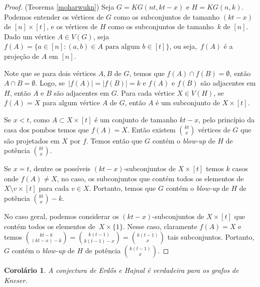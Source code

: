 \documentclass{article}
\newtheorem{corolario}{Corolário}
\begin{document}
\begin{proof}{(Teorema \ref{moharwukn})}
Seja $G = KG(nt, kt-x)$ e $H = KG(n,k)$. Podemos entender os vértices de $G$ como os subconjuntos de tamanho $(kt-x)$ de $[n]\times [t]$, e os vértices de $H$ como os subconjuntos de tamanho~$k$ de $[n]$. Dado um vértice $A\in V(G)$, seja $f(A) = \{a\in [n] : (a,b)\in A \text{ para algum }b\in [t]\}$, ou seja,~$f(A)$ é a projeção de $A$ em $[n]$.

Note que se para dois vértices $A,B$ de $G$, temos que $f(A)\cap f(B) = \emptyset$, então $A\cap B = \emptyset$. Logo, se~$|f(A)| = |f(B)| = k$ e $f(A)$ e $f(B)$ são adjacentes em $H$, então $A$ e $B$ são adjacentes em $G$. Para cada vértice $X\in V(H)$, se $f(A) = X$ para algum vértice $A$ de $G$, então $A$ é um subconjunto de $X \times [t]$.

Se $x<t$, como $A \subset X \times [t]$ é um conjunto de tamanho $kt-x$, pelo princípio da casa dos pombos temos que $f(A) = X$. Então existem $\binom{kt}{x}$ vértices de $G$ que são projetados em $X$ por $f$. Temos então que $G$ contém o \textit{blow-up} de $H$ de potência $\binom{kt}{x}$.

Se $x=t$, dentre os possíveis $(kt-x)$-subconjuntos de $X \times [t]$ temos $k$ casos onde $f(A) \neq X$, no caso, os subconjuntos que contém todos os elementos de $X\setminus v \times [t]$ para cada $v\in X$. Portanto, temos que $G$ contém o \textit{blow-up} de $H$ de potência $\binom{kt}{x}-k$.

No caso geral, podemos considerar os $(kt-x)$-subconjuntos de $X\times [t]$ que contém todos os elementos de~$X \times \{1\}$. Nesse caso, claramente $f(A) = X$ e temos $\binom{kt-k}{(kt-x)-k} = \binom{k(t-1)}{k(t-1)-x} = \binom{k(t-1)}{x}$ tais subconjuntos. Portanto, $G$ contém o \textit{blow-up} de $H$ de potência $\binom{k(t-1)}{x}$.
\end{proof}

\begin{corolario}\label{knesercor}
A conjectura de Erd\H{o}s e Hajnal é verdadeira para os grafos de Kneser.
\end{corolario}
\end{document}
